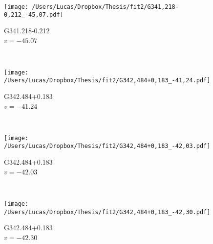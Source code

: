 \begin{figure*}[t]
\begin{subfigure}[t]{0.3\textwidth}
	\end{subfigure}
	~
	\begin{subfigure}[t]{0.3\textwidth}
		\texttt{[image: /Users/Lucas/Dropbox/Thesis/fit2/G341,218-0,212\_-45,07.pdf]}
		\caption[]{G341.218-0.212\\$v=-45.07$\,\kms}
	\end{subfigure}
	~
	\begin{subfigure}[t]{0.3\textwidth}
		\texttt{[image: /Users/Lucas/Dropbox/Thesis/fit2/G342,484+0,183\_-41,24.pdf]}
		\caption[]{G342.484+0.183\\$v=-41.24$\,\kms}
	\end{subfigure}
	~
	\begin{subfigure}[t]{0.3\textwidth}
		\texttt{[image: /Users/Lucas/Dropbox/Thesis/fit2/G342,484+0,183\_-42,03.pdf]}
		\caption[]{G342.484+0.183\\$v=-42.03$\,\kms}
	\end{subfigure}
	~
	\begin{subfigure}[t]{0.3\textwidth}
		\texttt{[image: /Users/Lucas/Dropbox/Thesis/fit2/G342,484+0,183\_-42,30.pdf]}
		\caption[]{G342.484+0.183\\$v=-42.30$\,\kms}
	\end{subfigure}
	~
\end{figure*}
\clearpage
